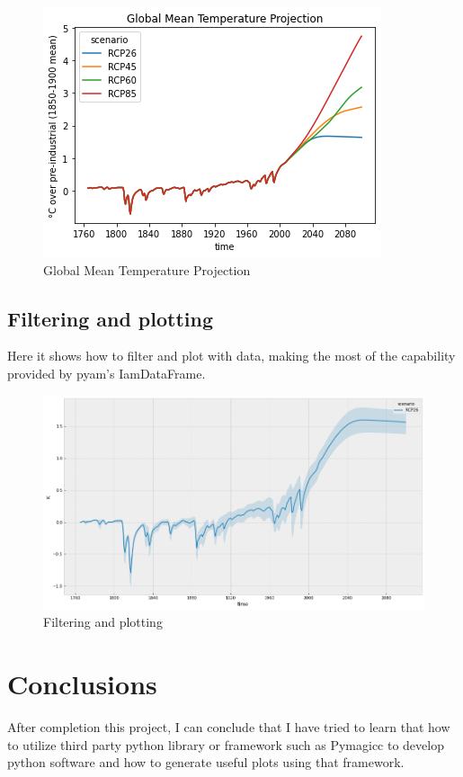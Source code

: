 \documentclass[12pt, letterpaper]{article}
\begin{document}
\begin{figure}[H]
\centering
\includegraphics[scale=0.7]{Task2.PNG}
\caption{Global Mean Temperature Projection}
\label{fig:Task2}
\end{figure}

\subsection{Filtering and plotting}
Here it shows how to filter and plot with data, making the most of the capability provided by pyam's IamDataFrame.

\begin{figure}[H]
\centering
\includegraphics[scale=0.4]{Task3.PNG}
\caption{Filtering and plotting}
\label{fig:Task3}
\end{figure}

\section{Conclusions}
After completion this project, I can conclude that I have tried to learn that how to utilize third party python library or framework such as Pymagicc to develop python software and how to generate useful plots using that framework.
\end{document}
